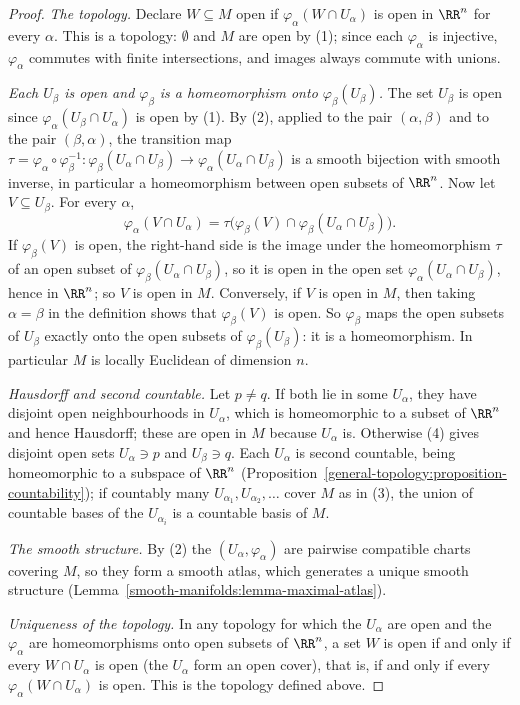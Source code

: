 \begin{proof}
\emph{The topology.} Declare $W \subseteq M$ open if $\varphi_\alpha(W \cap U_\alpha)$ is open in $\RR^n$ for every $\alpha$. This is a topology: $\emptyset$ and
$M$ are open by (1); since each $\varphi_\alpha$ is injective, $\varphi_\alpha$ commutes with finite intersections, and images always commute with unions.

\emph{Each $U_\beta$ is open and $\varphi_\beta$ is a homeomorphism onto $\varphi_\beta(U_\beta)$.} The set $U_\beta$ is open since
$\varphi_\alpha(U_\beta \cap U_\alpha)$ is open by (1). By (2), applied to the pair $(\alpha, \beta)$ and to the pair $(\beta, \alpha)$, the transition map
$\tau = \varphi_\alpha \circ \varphi_\beta^{-1} \colon \varphi_\beta(U_\alpha \cap U_\beta) \to \varphi_\alpha(U_\alpha \cap U_\beta)$ is a smooth bijection with
smooth inverse, in particular a homeomorphism between open subsets of $\RR^n$. Now let $V \subseteq U_\beta$. For every $\alpha$,
\[
\varphi_\alpha(V \cap U_\alpha) = \tau\bigl(\varphi_\beta(V) \cap \varphi_\beta(U_\alpha \cap U_\beta)\bigr).
\]
If $\varphi_\beta(V)$ is open, the right-hand side is the image under the homeomorphism $\tau$ of an open subset of $\varphi_\beta(U_\alpha \cap U_\beta)$, so it
is open in the open set $\varphi_\alpha(U_\alpha \cap U_\beta)$, hence in $\RR^n$; so $V$ is open in $M$. Conversely, if $V$ is open in $M$, then taking
$\alpha = \beta$ in the definition shows that $\varphi_\beta(V)$ is open. So $\varphi_\beta$ maps the open subsets of $U_\beta$ exactly onto the open subsets of
$\varphi_\beta(U_\beta)$: it is a homeomorphism. In particular $M$ is locally Euclidean of dimension $n$.

\emph{Hausdorff and second countable.} Let $p \neq q$. If both lie in some $U_\alpha$, they have disjoint open neighbourhoods in $U_\alpha$, which is
homeomorphic to a subset of $\RR^n$ and hence Hausdorff; these are open in $M$ because $U_\alpha$ is. Otherwise (4) gives disjoint open sets $U_\alpha \ni p$ and
$U_\beta \ni q$. Each $U_\alpha$ is second countable, being homeomorphic to a subspace of $\RR^n$ (Proposition~\ref{general-topology:proposition-countability});
if countably many $U_{\alpha_1}, U_{\alpha_2}, \ldots$ cover $M$ as in (3), the union of countable bases of the $U_{\alpha_i}$ is a countable basis of $M$.

\emph{The smooth structure.} By (2) the $(U_\alpha, \varphi_\alpha)$ are pairwise compatible charts covering $M$, so they form a smooth atlas, which generates a
unique smooth structure (Lemma~\ref{smooth-manifolds:lemma-maximal-atlas}).

\emph{Uniqueness of the topology.} In any topology for which the $U_\alpha$ are open and the $\varphi_\alpha$ are homeomorphisms onto open subsets of $\RR^n$, a
set $W$ is open if and only if every $W \cap U_\alpha$ is open (the $U_\alpha$ form an open cover), that is, if and only if every $\varphi_\alpha(W \cap U_\alpha)$
is open. This is the topology defined above.
\end{proof}

